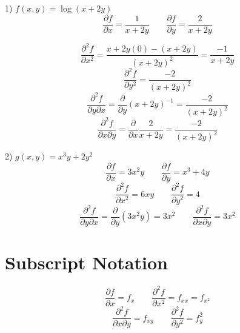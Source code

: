 \documentclass{article}
\begin{document}
1) $f(x,y) = \log(x+2y)$
\[\frac{\partial f}{\partial x} = \frac{1}{x+2y}\qquad \frac{\partial f}{\partial y}=\frac{2}{x+2y}\]

\[\frac{\partial^2 f}{\partial x^2}=\frac{x+2y(0)-(x+2y)}{(x+2y)^2}=\frac{-1}{x+2y}\]
\[\frac{\partial^2 f}{\partial y^2}=\frac{-2}{(x+2y)^2}\]
\[\frac{\partial^2 f}{\partial y \partial x}= \frac{\partial}{\partial y}(x+2y)^{-1}=\frac{-2}{(x+2y)^2}\]
\[\frac{\partial^2 f}{\partial x \partial y}= \frac{\partial}{\partial x}\frac{2}{x+2y}=\frac{-2}{(x+2y)^2}\]
\newpage

2) $g(x,y)=x^{3}y+2y^2$
\[\frac{\partial f}{\partial x}=3x^{2}y\qquad \frac{\partial f}{\partial y}=x^3+4y\]
\[\frac{\partial^2 f}{\partial x^2}=6xy\qquad \frac{\partial^2 f}{\partial y^2}=4\]
\[\frac{\partial^2 f}{\partial y \partial x}=\frac{\partial}{\partial y}(3x^2y)=3x^2\qquad \frac{\partial^2 f}{\partial x \partial y}=3x^2\]

\section{Subscript Notation}
\[\frac{\partial f}{\partial x}=f_x\qquad \frac{\partial^2 f}{\partial x^2}=f_{xx} =f_{x^2}\]
\[\frac{\partial^2 f}{\partial x \partial y}= f_{xy}\qquad \frac{\partial^2 f}{\partial y^2}=f_y^2\]
\end{document}
